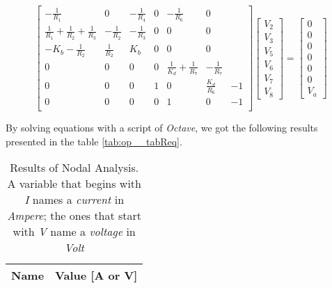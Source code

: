 \[
  \begin{bmatrix}
    -\frac{1}{R_1}                                & 0              & -\frac{1}{R_4} & 0 & -\frac{1}{R_6}                & 0                    \\
    \frac{1}{R_1} + \frac{1}{R_2} + \frac{1}{R_3} & -\frac{1}{R_2} & -\frac{1}{R_3} & 0 & 0                             & 0                    \\
    -K_b - \frac{1}{R_2}                          & \frac{1}{R_2}  & K_b            & 0 & 0                             & 0                    \\
    0                                             & 0              & 0              & 0 & \frac{1}{K_d} + \frac{1}{R_7} & -\frac{1}{R_7}       \\
    0                                             & 0              & 0              & 1 & 0                             & \frac{K_d}{R_6} & -1 \\
    0                                             & 0              & 0              & 0 & 1                             & 0               & -1 \\
  \end{bmatrix}
  \begin{bmatrix}
    V_2 \\ V_3 \\ V_5 \\ V_6 \\ V_7 \\ V_8
  \end{bmatrix}
  =
  \begin{bmatrix}
    0 \\ 0 \\ 0 \\ 0 \\ 0  \\ 0 \\ V_a
  \end{bmatrix}
\]

\hfill

By solving equations with a script of \textit{Octave}, we got the following results presented in the table \ref{tab:op__tabReq}.

\begin{table}[b]
  \centering
  \begin{tabular}{|l|r|}
    \hline
    {\bf Name} & {\bf Value [A or V]} \\ \hline
    
  \end{tabular}
  \caption{Results of Nodal Analysis. A variable that begins  with \textit{I} names a \textit{current} in \textit{Ampere}; the ones that start with \textit{V} name a \textit{voltage} in \textit{Volt} }
  \label{tab:op_tabReq}
\end{table}

